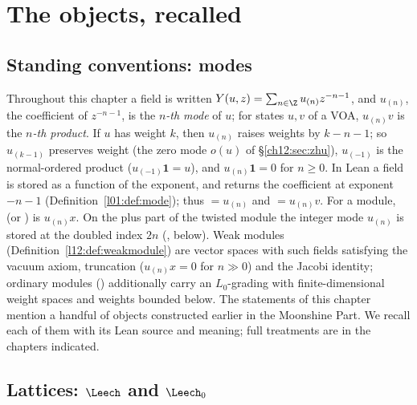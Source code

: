 \section{The objects, recalled}\label{ch12:sec:recall}

\subsection{Standing conventions: modes}\label{ch12:sec:modes}

Throughout this chapter a field is written $Y(u,z)=\sum_{n\in\Z}u_{(n)}z^{-n-1}$, and $u_{(n)}$, the
coefficient of $z^{-n-1}$, is the \emph{$n$-th mode} of $u$; for states $u,v$ of a VOA, $u_{(n)}v$ is
the \emph{$n$-th product}.  If $u$ has weight $k$, then $u_{(n)}$ raises weights by $k-n-1$; so
$u_{(k-1)}$ preserves weight (the zero mode $o(u)$ of \S\ref{ch12:sec:zhu}), $u_{(-1)}$ is the
normal-ordered product ($u_{(-1)}\mathbf 1=u$), and $u_{(n)}\mathbf 1=0$ for $n\ge0$.  In Lean a field is
stored as a function of the exponent, and  returns the coefficient at exponent $-n-1$
(Definition~\ref{l01:def:mode}); thus  $=u_{(n)}$ and  $=u_{(n)}v$.  For a
module,  (or ) is $u_{(n)}x$.  On the plus part of the twisted
module the integer mode $u_{(n)}$ is stored at the doubled index $2n$ (, below).
Weak modules (Definition~\ref{l12:def:weakmodule}) are vector spaces with such fields satisfying the vacuum axiom,
truncation ($u_{(n)}x=0$ for $n\gg0$) and the Jacobi identity; ordinary modules ()
additionally carry an $L_0$-grading with finite-dimensional weight spaces and weights bounded below.
The statements of this chapter mention a handful of objects constructed earlier in the Moonshine
Part.  We recall each of them with its Lean source and meaning; full treatments are in the chapters
indicated.

\subsection{Lattices: \texorpdfstring{$\Leech$}{Λ} and \texorpdfstring{$\Leech_0$}{Λ₀}}

